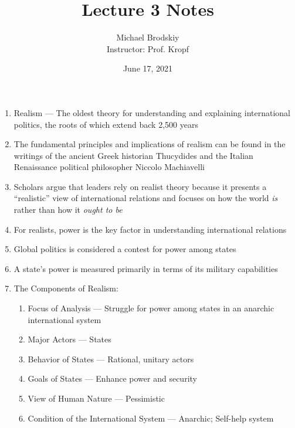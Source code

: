 \documentclass[12pt]{article}
\title{Lecture 3 Notes}
\date{June 17, 2021}
\author{Michael Brodskiy\\ \small Instructor: Prof. Kropf}
\begin{document}
    \maketitle

    \begin{enumerate}

      \item Realism — The oldest theory for understanding and explaining international politics, the roots of which extend back 2,500 years

      \item The fundamental principles and implications of realism can be found in the writings of the ancient Greek historian Thucydides and the Italian Renaissance political philosopher Niccolo Machiavelli

      \item Scholars argue that leaders rely on realist theory because it presents a “realistic” view of international relations and focuses on how the world \textit{is} rather than how it \textit{ought to be}

      \item For realists, power is the key factor in understanding international relations

      \item Global politics is considered a contest for power among states

      \item A state's power is measured primarily in terms of its military capabilities

      \item The Components of Realism:

        \begin{enumerate}

          \item Focus of Analysis — Struggle for power among states in an anarchic international system

          \item Major Actors — States

          \item Behavior of States — Rational, unitary actors

          \item Goals of States — Enhance power and security

          \item View of Human Nature — Pessimistic

          \item Condition of the International System — Anarchic; Self-help system


\end{enumerate}
\end{enumerate}
\end{document}

